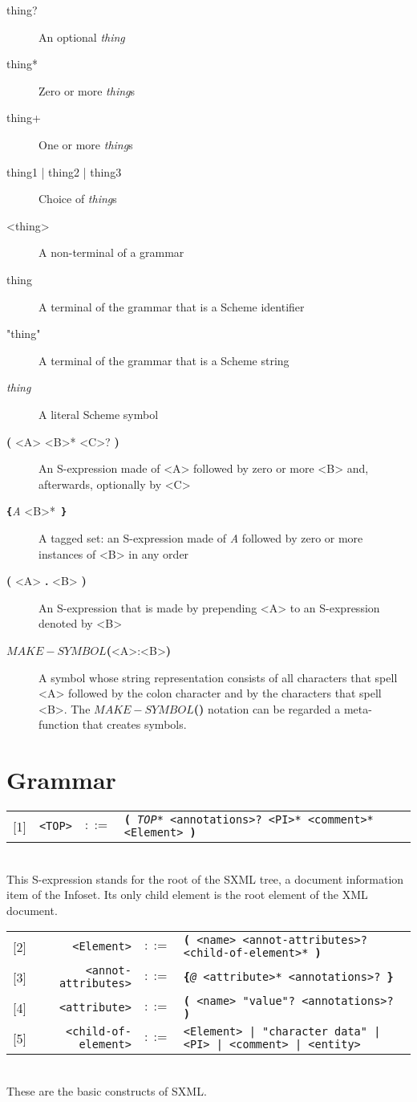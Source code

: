 \documentclass[10pt]{article}
\begin{document}
\begin{description}
\item [thing?] An optional \emph{thing}
\item [thing*] Zero or more \emph{thing}s
\item [thing+] One or more \emph{thing}s
\item [thing1 | thing2 | thing3] Choice of \emph{thing}s
\item [<thing>] A non-terminal of a grammar
\item [thing] A terminal of the grammar that is a Scheme identifier
\item ["thing"] A terminal of the grammar that is a Scheme string
\item [{\itshape thing}] A literal Scheme symbol
\item [\textbf{(} <A> <B>* <C>? \textbf{)}] An S-expression made of <A> followed by zero or more <B> and, afterwards, optionally by <C>
\item [\texttt{\textbf{\{}}{\itshape A} <B>*\texttt{ \textbf{\}}}] A tagged set: an S-expression made of {\itshape A} followed by zero or more instances of <B> in any order
\item [\textbf{(} <A>\textbf{ . }<B> \textbf{)}] An S-expression that is made by prepending <A> to an S-expression denoted by <B>
\item [\textbf{$MAKE{-}SYMBOL$(}<A>:<B>\textbf{)}] A symbol whose string representation consists of all
characters that spell <A> followed by the colon
character and by the characters that spell <B>. The \textbf{$MAKE{-}SYMBOL$(}\textbf{)} notation can be regarded a
meta-function that creates symbols.
\end{description}
\section{Grammar}
\begin{tabular}{rrcp{2.8in}}
{[}1{]} & \texttt{<TOP>} &  $::=$ & \texttt{\textbf{(} {\itshape *TOP*} <annotations>? <PI>* <comment>* <Element> \textbf{)} } \\
\end{tabular}
\\
This S-expression stands for the root of the SXML tree, a
document information item of the Infoset. Its only child element is
the root element of the XML document.

\begin{tabular}{rrcp{2.8in}}
{[}2{]} & \texttt{<Element>} &  $::=$ & \texttt{\textbf{(} <name> <annot-attributes>? <child-of-element>* \textbf{)} } \\
{[}3{]} & \texttt{<annot-attributes>} &  $::=$ & \texttt{\texttt{\textbf{\{}}{\itshape @} <attribute>* <annotations>?\texttt{ \textbf{\}}} } \\
{[}4{]} & \texttt{<attribute>} &  $::=$ & \texttt{\textbf{(} <name> "value"? <annotations>? \textbf{)} } \\
{[}5{]} & \texttt{<child-of-element>} &  $::=$ & \texttt{<Element> | "character data" | <PI> | <comment> | <entity> } \\
\end{tabular}
\\
These are the basic constructs of SXML.
\end{document}

